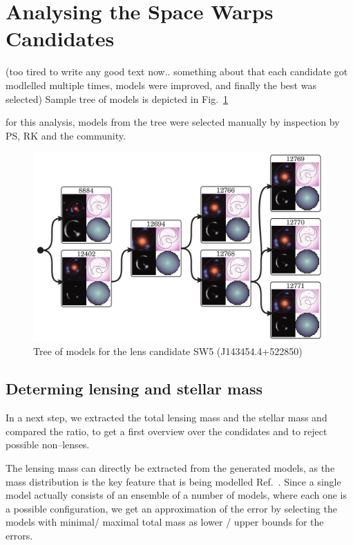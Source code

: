 \documentclass{ws-procs975x65}
\newcommand{\sw}{Space Warps\xspace}
\newcommand{\icite}[1]{Ref.~\refcite{#1}} %
\newcommand{\figref}[1]{Fig.~\ref{fig:#1}}
\begin{document}
\section{Analysing the \sw Candidates}

(too tired to write any good text now..
something about that each candidate got modlelled multiple times, models were improved, and finally the best was selected) Sample tree of models is depicted in \figref{tree}

for this analysis, models from the tree were selected manually by inspection by PS, RK and the community.

\begin{figure}
  \centering
  \includegraphics[width=\columnwidth]{img/modeltree}
  \caption{
    Tree of models for the lens candidate SW5 (J143454.4+522850)
  }
  \label{fig:tree}
\end{figure}



\subsection{Determing lensing and stellar mass}

In a next step, we extracted the total lensing mass and the stellar mass and compared the ratio, to get a first overview over the condidates and to reject possible non--lenses.

The lensing mass can directly be extracted from the generated models, as the mass distribution is the key feature that is being modelled \icite{Kueng2015}.
Since a single model actually consists of an ensemble of a number of models, where each one is a possible configuration, we get an approximation of the error by selecting the models with minimal/ maximal total mass as lower / upper bounds for the errors.
\end{document}
